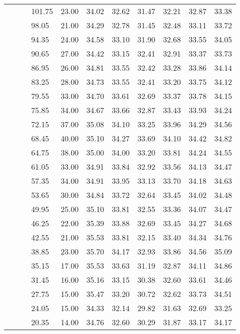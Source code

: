 \begin{longtable}{llllrrrrrrr}
   &  &  & 101.75 & 23.00 & 34.02 & 32.62 & 31.47 & 32.21 & 32.87 & 33.38 \\ 
   &  &  & 98.05 & 21.00 & 34.29 & 32.78 & 31.45 & 32.48 & 33.11 & 33.72 \\ 
   &  &  & 94.35 & 24.00 & 34.58 & 33.10 & 31.90 & 32.68 & 33.55 & 34.05 \\ 
   &  &  & 90.65 & 27.00 & 34.42 & 33.15 & 32.41 & 32.91 & 33.37 & 33.73 \\ 
   &  &  & 86.95 & 26.00 & 34.81 & 33.55 & 32.42 & 33.28 & 33.86 & 34.14 \\ 
   &  &  & 83.25 & 28.00 & 34.73 & 33.55 & 32.41 & 33.20 & 33.75 & 34.12 \\ 
   &  &  & 79.55 & 33.00 & 34.70 & 33.61 & 32.69 & 33.37 & 33.78 & 34.15 \\ 
   &  &  & 75.85 & 34.00 & 34.67 & 33.66 & 32.87 & 33.43 & 33.93 & 34.24 \\ 
   &  &  & 72.15 & 37.00 & 35.08 & 34.10 & 33.25 & 33.96 & 34.29 & 34.56 \\ 
   &  &  & 68.45 & 40.00 & 35.10 & 34.27 & 33.69 & 34.10 & 34.42 & 34.82 \\ 
   &  &  & 64.75 & 38.00 & 35.00 & 34.00 & 33.20 & 33.81 & 34.24 & 34.55 \\ 
   &  &  & 61.05 & 33.00 & 34.91 & 33.84 & 32.92 & 33.56 & 34.13 & 34.47 \\ 
   &  &  & 57.35 & 34.00 & 34.91 & 33.95 & 33.13 & 33.70 & 34.18 & 34.63 \\ 
   &  &  & 53.65 & 30.00 & 34.84 & 33.72 & 32.64 & 33.45 & 34.02 & 34.48 \\ 
   &  &  & 49.95 & 25.00 & 35.10 & 33.81 & 32.55 & 33.36 & 34.07 & 34.47 \\ 
   &  &  & 46.25 & 22.00 & 35.39 & 33.88 & 32.69 & 33.45 & 34.27 & 34.68 \\ 
   &  &  & 42.55 & 21.00 & 35.53 & 33.81 & 32.15 & 33.40 & 34.34 & 34.76 \\ 
   &  &  & 38.85 & 23.00 & 35.70 & 34.17 & 32.93 & 33.86 & 34.56 & 35.09 \\ 
   &  &  & 35.15 & 17.00 & 35.53 & 33.63 & 31.19 & 32.87 & 34.11 & 34.86 \\ 
   &  &  & 31.45 & 16.00 & 35.16 & 33.15 & 30.38 & 32.60 & 33.61 & 34.46 \\ 
   &  &  & 27.75 & 15.00 & 35.47 & 33.20 & 30.72 & 32.62 & 33.73 & 34.51 \\ 
   &  &  & 24.05 & 15.00 & 34.33 & 32.14 & 29.82 & 31.63 & 32.69 & 33.25 \\ 
   &  &  & 20.35 & 14.00 & 34.76 & 32.60 & 30.29 & 31.87 & 33.17 & 34.17 \\ 

\end{longtable}
